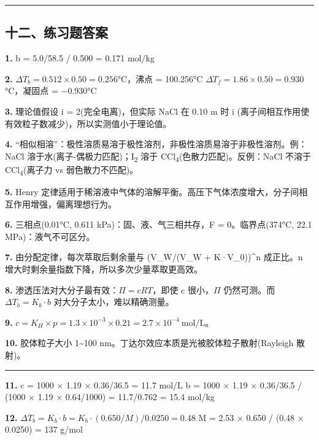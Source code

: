 \begin{center}\rule{0.5\linewidth}{0.5pt}\end{center}

\subsection{十二、练习题答案}\label{ux5341ux4e8cux7ec3ux4e60ux9898ux7b54ux6848}

\textbf{1.} b = 5.0/58.5 / 0.500 = 0.171 mol/kg

\textbf{2.} \(\Delta T_b = 0.512 \times 0.50 = 0.256\)°C，沸点 = 100.256°C
\(\Delta T_f = 1.86 \times 0.50 = 0.930\)°C，凝固点 = −0.930°C

\textbf{3.} 理论值假设 i = 2(完全电离)，但实际 NaCl 在 0.10 m 时 i (离子间相互作用使有效粒子数减少)，所以实测值小于理论值。

\textbf{4.} ``相似相溶''：极性溶质易溶于极性溶剂，非极性溶质易溶于非极性溶剂。例：NaCl 溶于水(离子-偶极力匹配)；I\textsubscript{2} 溶于 CCl\textsubscript{4}(色散力匹配)。反例：NaCl 不溶于 CCl\textsubscript{4}(离子力 vs 弱色散力不匹配)。

\textbf{5.} Henry 定律适用于稀溶液中气体的溶解平衡。高压下气体浓度增大，分子间相互作用增强，偏离理想行为。

\textbf{6.} 三相点(0.01°C, 0.611 kPa)：固、液、气三相共存，F = 0。临界点(374°C, 22.1 MPa)：液气不可区分。

\textbf{7.} 由分配定律，每次萃取后剩余量与 (V\_W/(V\_W + K·V\_0))\^{}n 成正比。n 增大时剩余量指数下降，所以多次少量萃取更高效。

\textbf{8.} 渗透压法对大分子最有效：\(\Pi = cRT\)，即使 c 很小，\(\Pi\) 仍然可测。而 \(\Delta T_b = K_b \cdot b\) 对大分子太小，难以精确测量。

\textbf{9.} \(c = K_H \times p = 1.3 \times 10^{-3} \times 0.21 = 2.7 \times 10^{-4}\ \mathrm{mol/L}\)。

\textbf{10.} 胶体粒子大小 1\textasciitilde100 nm。丁达尔效应本质是光被胶体粒子散射(Rayleigh 散射)。

\begin{center}\rule{0.5\linewidth}{0.5pt}\end{center}

\textbf{11.} c = 1000 × 1.19 × 0.36/36.5 = 11.7 mol/L
b = 1000 × 1.19 × 0.36/36.5 / (1000 × 1.19 × 0.64/1000) = 11.7/0.762 = 15.4 mol/kg

\textbf{12.} \(\Delta T_b = K_b \cdot b = K_b \cdot (0.650/M) / 0.0250 = 0.48\)
M = 2.53 × 0.650 / (0.48 × 0.0250) = 137 g/mol

